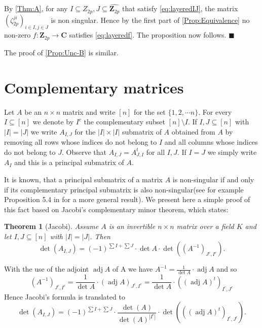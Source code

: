 \documentclass[a4paper,12pt,reqno]{amsart}
\newtheorem{theorem}{Theorem}
\DeclareMathOperator{\adj}{adj}
\newenvironment{proofofPropA}{{\bf {Proof of \autoref{Prop:Unc-A}.} }}{\hfill $\blacksquare$ \\}
\def\Z{\mathbf{Z}}
\def\C{\mathbf{C}}
\begin{document}
\begin{proofofPropA}
    By  \autoref{Thm:A}, for any $I \subseteq Z_{2p},  J \subseteq \widehat{\Z_{2p}}$ that satisfy \eqref{eq:layeredIJ}, the  matrix $(\zeta_{2p}^{ji})_{i \in I, j\in J}$  is non singular. Hence by the  first part of \autoref{Prop:Equivalence} no non-zero $f:\Z_{2p} \to \C$ satisfies \eqref{eq:layeredf}. The proposition now follows.
\end{proofofPropA}

The proof of \autoref{Prop:Unc-B} is similar.

\section{Complementary matrices} 
\label{Complementary}


Let $A$ be an $n \times n $ matrix and write $[n]$ for the set $\{ 1, 2, \cdots n \}$.  For every $I \subseteq [n]$ we denote by $I^c$ the complementary subset $[n] \setminus I $. If $I, J \subseteq [n]$ with $|I|=|J|$  we write  $A_{I, J}$ for the $|I| \times |I|$ submatrix of $A$ obtained from $A$ by removing all rows whose indices do not belong to $I$ and all columns  whose indices do not belong to $J$. Observe that
$A_{I,J} = A^t_{J,I}$  for all $I, J$.  If $I = J$ we simply write $A_I$ and this is a principal submatrix of $A$.

 It is known,  that a principal submatrix  of a matrix $A$  is non-singular  if and only if its complementary principal submatrix  is also non-singular(see for example Proposition 5.4 in \cite{Brow} for a more general result). We present here a simple proof of this fact based on 
Jacobi's complementary minor theorem, which states:
\begin{theorem}[Jacobi]
   Assume $A $ is an invertible $ n \times n$ matrix over a field $K$ and let $I, J \subseteq [n]$ with $|I|=|J|$. Then 
   \[
   \det (A_{I,J}) = (-1)^{\sum I +\sum J} \cdot \det A \cdot \det( (A^{-1})_{J^c, I^c}).
   \]
\end{theorem}
With the use of the adjoint $\adj A$ of A we have  $A^{-1} = \frac{1}{\det A} \cdot \adj A$ and  so  
\[
(A^{-1})_{J^c, I^c}=  \frac{1}{\det A} \cdot (\adj A)_{J^c, I^c}= \frac{1}{\det A} \cdot ((\adj A)^t)_{I^c, J^c}
\]
Hence Jacobi's formula is translated to 
\begin{equation}\label{eq:jacobi-adj}
   \det (A_{I,J})= (-1)^{\sum I +\sum J} \cdot \frac{\det(A)}{\det(A)^{|I^c|}} \cdot \det(((\adj A)^t)_{I^c, J^c}).
\end{equation}
\end{document}
